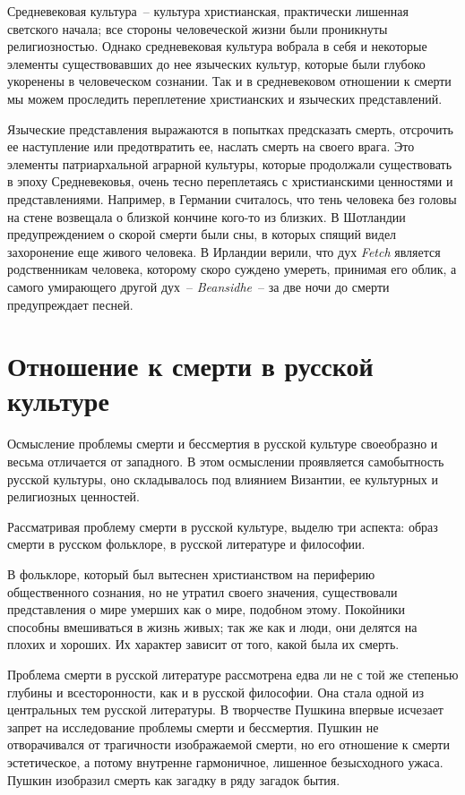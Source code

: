 \documentclass[pscyr,titlepage]{hedreport}
\begin{document}
  Средневековая культура~-- культура христианская, практически лишенная
  светского начала; все стороны человеческой жизни были проникнуты
  религиозностью. Однако средневековая культура вобрала в себя и некоторые
  элементы существовавших до нее языческих культур, которые были глубоко
  укоренены в человеческом сознании. Так и в средневековом отношении к смерти мы
  можем проследить переплетение христианских и языческих представлений.

  Языческие представления выражаются в попытках предсказать смерть, отсрочить ее
  наступление или предотвратить ее, наслать смерть на своего врага. Это элементы
  патриархальной аграрной культуры, которые продолжали существовать в эпоху
  Средневековья, очень тесно переплетаясь с христианскими ценностями и
  представлениями. Например, в Германии считалось, что тень человека без
  головы на стене возвещала о близкой кончине кого-то из близких. В Шотландии
  предупреждением о скорой смерти были сны, в которых спящий видел захоронение
  еще живого человека. В Ирландии верили, что дух \emph{Fetch} является
  родственникам человека, которому скоро суждено умереть, принимая его облик, а
  самого умирающего другой дух~-- \emph{Beansidhe}~-- за две ночи до смерти
  предупреждает песней.

  \chapter{Отношение к смерти в русской культуре}

  Осмысление проблемы смерти и бессмертия в русской культуре своеобразно и
  весьма отличается от западного. В этом осмыслении проявляется самобытность
  русской культуры, оно складывалось под влиянием Византии, ее культурных и
  религиозных ценностей.

  Рассматривая проблему смерти в русской культуре, выделю три аспекта: образ
  смерти в русском фольклоре, в русской литературе и философии.

  В фольклоре, который был вытеснен христианством на периферию общественного
  сознания, но не утратил своего значения, существовали представления о мире
  умерших как о мире, подобном этому. Покойники способны вмешиваться в жизнь
  живых; так же как и люди, они делятся на плохих и хороших. Их характер зависит
  от того, какой была их смерть.

  Проблема смерти в русской литературе рассмотрена едва ли не с той же степенью
  глубины и всесторонности, как и в русской философии. Она стала одной из
  центральных тем русской литературы. В творчестве Пушкина впервые исчезает
  запрет на исследование проблемы смерти и бессмертия. Пушкин не отворачивался
  от трагичности изображаемой смерти, но его отношение к смерти эстетическое, а
  потому внутренне гармоничное, лишенное безысходного ужаса. Пушкин изобразил
  смерть как загадку в ряду загадок бытия.
\end{document}
